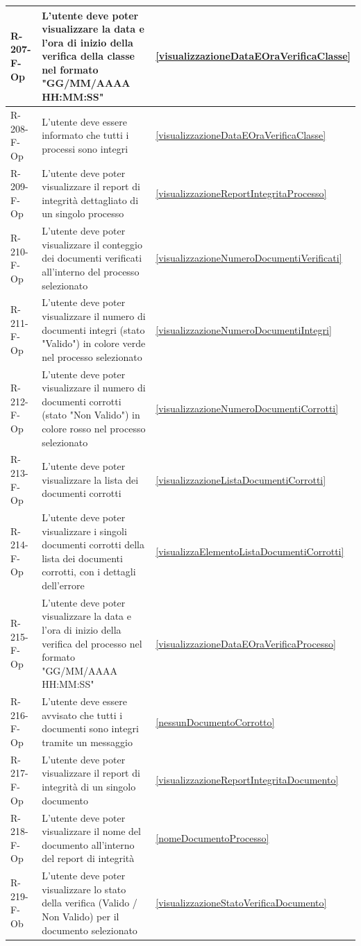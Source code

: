 \begin{longtable}{|p{2.5cm}|p{9.5cm}|p{2.5cm}|}
\hline
R-207-F-Op & L'utente deve poter visualizzare la data e l'ora di inizio della verifica della classe nel formato "GG/MM/AAAA HH:MM:SS" & \ref{visualizzazioneDataEOraVerificaClasse} \\
\hline
R-208-F-Op & L'utente deve essere informato che tutti i processi sono integri & \ref{visualizzazioneDataEOraVerificaClasse} \\
\hline
R-209-F-Op & L'utente deve poter visualizzare il report di integrità dettagliato di un singolo processo & \ref{visualizzazioneReportIntegritaProcesso} \\
\hline
R-210-F-Op & L'utente deve poter visualizzare il conteggio dei documenti verificati all'interno del processo selezionato & \ref{visualizzazioneNumeroDocumentiVerificati} \\
\hline
R-211-F-Op & L'utente deve poter visualizzare il numero di documenti integri (stato "Valido") in colore verde nel processo selezionato & \ref{visualizzazioneNumeroDocumentiIntegri} \\
\hline
R-212-F-Op & L'utente deve poter visualizzare il numero di documenti corrotti (stato "Non Valido") in colore rosso nel processo selezionato & \ref{visualizzazioneNumeroDocumentiCorrotti} \\
\hline
R-213-F-Op & L'utente deve poter visualizzare la lista dei documenti corrotti & \ref{visualizzazioneListaDocumentiCorrotti} \\
\hline
R-214-F-Op & L'utente deve poter visualizzare i singoli documenti corrotti della lista dei documenti corrotti, con i dettagli dell'errore & \ref{visualizzaElementoListaDocumentiCorrotti} \\
\hline
R-215-F-Op & L'utente deve poter visualizzare la data e l'ora di inizio della verifica del processo nel formato "GG/MM/AAAA HH:MM:SS" & \ref{visualizzazioneDataEOraVerificaProcesso} \\
\hline
R-216-F-Op & L'utente deve essere avvisato che tutti i documenti sono integri tramite un messaggio & \ref{nessunDocumentoCorrotto} \\
\hline
R-217-F-Op & L'utente deve poter visualizzare il report di integrità di un singolo documento & \ref{visualizzazioneReportIntegritaDocumento} \\
\hline
R-218-F-Op & L'utente deve poter visualizzare il nome del documento all'interno del report di integrità & \ref{nomeDocumentoProcesso} \\
\hline
R-219-F-Ob & L'utente deve poter visualizzare lo stato della verifica (Valido / Non Valido) per il documento selezionato & \ref{visualizzazioneStatoVerificaDocumento} \\

\end{longtable}

